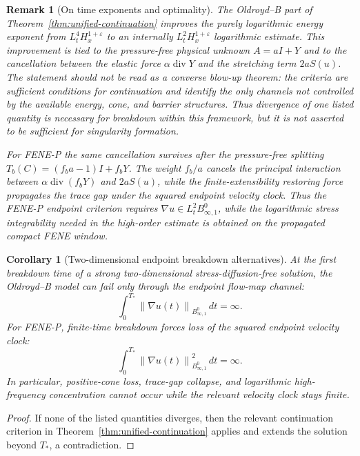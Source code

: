 \documentclass[11pt]{article}
\newtheorem{corollary}{Corollary}[section]
\newtheorem{remark}{Remark}[section]
\newcommand{\divv}{\operatorname{div}}
\newcommand{\eps}{\varepsilon}
\newcommand{\norm}[1]{\left\lVert #1\right\rVert}
\newcommand{\Besov}{B^0_{\infty,1}}
\begin{document}
\begin{remark}[On time exponents and optimality]
The Oldroyd--B part of Theorem~\ref{thm:unified-continuation} improves the
purely logarithmic energy exponent from \(L^4_tH^{1+\eps}_x\) to an internally
\(L^2_tH^{1+\eps}_x\) logarithmic estimate.  This improvement is tied to the pressure-free
physical unknown \(A=aI+Y\) and to the cancellation between the elastic force
\(\alpha\divv Y\) and the stretching term \(2aS(u)\).  The statement should not
be read as a converse blow-up theorem: the criteria are sufficient conditions
for continuation and identify the only channels not controlled by the available
energy, cone, and barrier structures.  Thus divergence of one listed quantity
is necessary for breakdown within this framework, but it is not asserted to be
sufficient for singularity formation.

For FENE-P the same cancellation survives after the pressure-free splitting
\(T_b(C)=(f_ba-1)I+f_bY\).  The weight \(f_b/a\) cancels the principal
interaction between \(\alpha\divv(f_bY)\) and \(2aS(u)\), while the
finite-extensibility restoring force propagates the trace gap under the
squared endpoint velocity clock.  Thus the FENE-P endpoint criterion requires
\(\nabla u\in L^2_tB^0_{\infty,1}\), while the logarithmic stress
integrability needed in the high-order estimate is obtained on the propagated
compact FENE window.
\end{remark}

\begin{corollary}[Two-dimensional endpoint breakdown alternatives]
\label{cor:unified-three-channel}
At the first breakdown time of a strong two-dimensional stress-diffusion-free
solution, the Oldroyd--B model can fail only through the endpoint flow-map
channel:
\[
  \int_0^{T_*}\norm{\nabla u(t)}_{\Besov}\,dt=\infty .
\]
For FENE-P, finite-time breakdown forces loss of the squared endpoint velocity
clock:
\[
  \int_0^{T_*}\norm{\nabla u(t)}_{\Besov}^2\,dt=\infty .
\]
In particular, positive-cone loss, trace-gap collapse, and logarithmic
high-frequency concentration cannot occur while the relevant velocity clock
stays finite.
\end{corollary}

\begin{proof}
If none of the listed quantities diverges, then the relevant continuation
criterion in Theorem~\ref{thm:unified-continuation} applies and extends the
solution beyond \(T_*\), a contradiction.
\end{proof}
\end{document}
